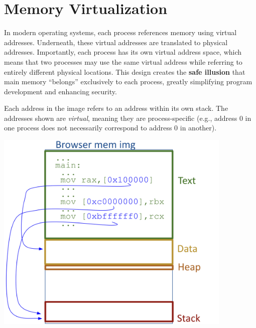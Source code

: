 \newpage
\section{Memory Virtualization}
In modern operating systems, each process references memory using virtual addresses. Underneath, these virtual addresses are translated to physical addresses. Importantly, each process has its own virtual address space, which means that two processes may use the same virtual address while referring to entirely different physical locations. This design creates the \textbf{safe illusion} that main memory “belongs” exclusively to each process, greatly simplifying program development and enhancing security.

\noindent
\begin{minipage}{0.45\textwidth}
Each address in the image refers to an address within its own stack. The addresses shown are \emph{virtual}, meaning they are process-specific (e.g., address 0 in one process does not necessarily correspond to address 0 in another).
\end{minipage}%
\hfill
\vline
\hfill
\begin{minipage}{0.45\textwidth}
\begin{center}
    \includegraphics[width=0.85\textwidth]{chapters/L4/images/browser-img.png}
\end{center}
\end{minipage}\\[10px]

